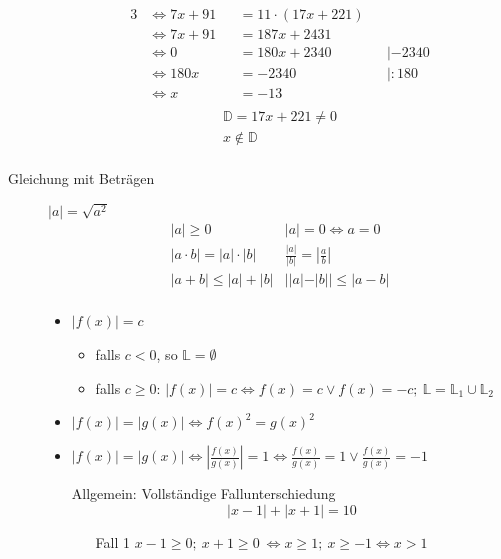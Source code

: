 \begin{description}
\begin{alignat*}{3}
        & \Leftrightarrow 7x + 91     &  & = 11 \cdot (17x+221)                          \\
        & \Leftrightarrow 7x + 91     &  & = 187x + 2431                                 \\
        & \Leftrightarrow 0           &  & = 180x +2340         &  & |-2340              \\
        & \Leftrightarrow 180x        &  & = -2340              &  & | :180              \\
        & \Leftrightarrow x           &  & = -13                                         \\
    \end{alignat*}
    \begin{gather*}
        \mathbb{D} = 17x+221 \not = 0\\
        x \not \in \mathbb{D}\\
    \end{gather*}
    \item[Gleichung mit Beträgen] $|a| = \sqrt{a^2}$
    \[\begin{array}{ll}
          |a| \geq 0                  & |a| = 0 \Leftrightarrow a = 0              \\
          |a \cdot b| = |a| \cdot |b| & \frac{|a|}{|b|} = \left|\frac{a}{b}\right| \\
          |a+b| \leq  |a| + |b|         & ||a|-|b|| \leq |a-b|                       \\
    \end{array}\]
    \begin{itemize}
        \item $|f(x)| = c$ \
        \begin{itemize}
            \item falls $c<0$, so $\mathbb{L}= \emptyset$
            \item falls $c\geq0$: $|f(x)| = c \Leftrightarrow f(x) = c \vee f(x) = -c;\ \mathbb{L} = \mathbb{L}_1 \cup \mathbb{L}_2$
        \end{itemize}
        \item $|f(x)| = |g(x)| \Leftrightarrow f(x)^2 = g(x)^2$
        \item $|f(x)| = |g(x)| \Leftrightarrow \left|\frac{f(x)}{g(x)}\right| = 1 \Leftrightarrow \frac{f(x)}{g(x)} = 1 \vee \frac{f(x)}{g(x)} = -1$
        \item[Allgemein:] Vollständige Fallunterschiedung
        \[|x-1|+|x+1|=10\]
        \begin{itemize}
            \item[Fall 1] $x-1 \geq 0;\ x+1 \geq 0 \ \Leftrightarrow x \geq 1;\ x\geq -1 \Leftrightarrow x>1$

\end{itemize}
\end{itemize}
\end{description}
